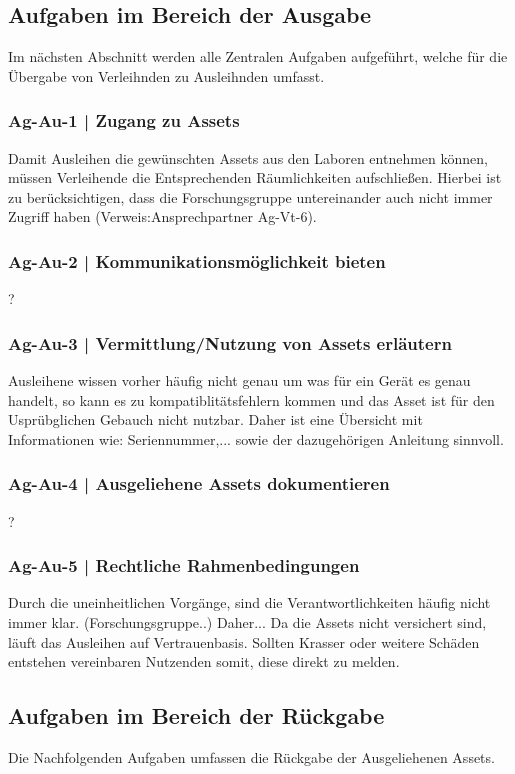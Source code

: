 \subsection{Aufgaben im Bereich der Ausgabe}
Im nächsten Abschnitt werden alle Zentralen Aufgaben aufgeführt, welche für die Übergabe von
Verleihnden zu Ausleihnden umfasst.
\subsubsection{Ag-Au-1 | Zugang zu Assets}
Damit Ausleihen die gewünschten Assets aus den Laboren entnehmen können, müssen Verleihende die
Entsprechenden Räumlichkeiten aufschließen. Hierbei ist zu berücksichtigen, dass die
Forschungsgruppe untereinander auch nicht immer Zugriff haben (Verweis:Ansprechpartner Ag-Vt-6).
\subsubsection{Ag-Au-2 | Kommunikationsmöglichkeit bieten}
?
\subsubsection{Ag-Au-3 | Vermittlung/Nutzung von Assets erläutern}
Ausleihene wissen vorher häufig nicht genau um was für ein Gerät es genau handelt, so kann es zu
kompatiblitätsfehlern kommen und das Asset ist für den Usprübglichen Gebauch nicht nutzbar. Daher
ist eine Übersicht mit Informationen wie: Seriennummer,... sowie der dazugehörigen Anleitung
sinnvoll.
\subsubsection{Ag-Au-4 | Ausgeliehene Assets dokumentieren}
?
\subsubsection{Ag-Au-5 | Rechtliche Rahmenbedingungen}
Durch die uneinheitlichen Vorgänge, sind die Verantwortlichkeiten häufig nicht immer klar.
(Forschungsgruppe..) Daher... Da die Assets nicht versichert sind, läuft das Ausleihen auf
Vertrauenbasis. Sollten Krasser oder weitere Schäden entstehen vereinbaren Nutzenden somit, diese
direkt zu melden.

\subsection{Aufgaben im Bereich der Rückgabe}
Die Nachfolgenden Aufgaben umfassen die Rückgabe der Ausgeliehenen Assets.


